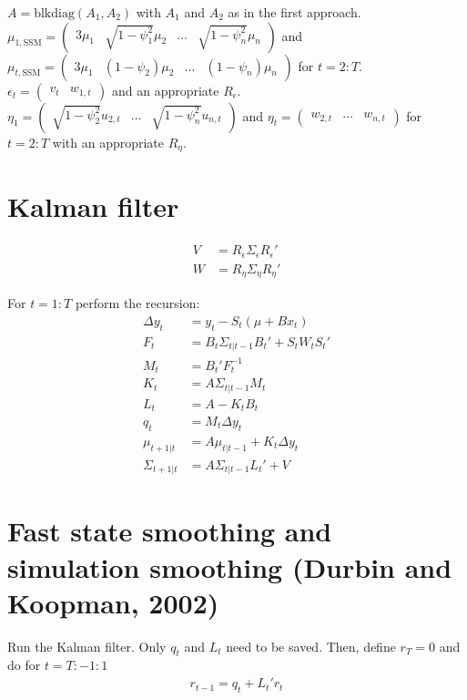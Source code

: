 $A = \mathrm{blkdiag}(A_1, A_2)$ with $A_1$ and $A_2$ as in the first approach. $\mu_{1,\mathrm{SSM}} = \begin{pmatrix} 3\mu_1& \sqrt{1-\psi_1^2}\mu_2 & \dots & \sqrt{1-\psi_n^2}\mu_n \end{pmatrix}$ and $\mu_{t,\mathrm{SSM}} = \begin{pmatrix} 3\mu_1& (1-\psi_2)\mu_2 & \dots & (1-\psi_n)\mu_n \end{pmatrix}$ for $t=2:T$. $\epsilon_t = \begin{pmatrix} v_t & w_{1,t} \end{pmatrix}$ and an appropriate $R_\epsilon$. $\eta_1 = \begin{pmatrix} \sqrt{1-\psi_2^2} u_{2,t} & \dots & \sqrt{1-\psi_n^2} u_{n,t} \end{pmatrix}$ and $\eta_t = \begin{pmatrix} w_{2,t} & \dots & w_{n,t} \end{pmatrix}$ for $t=2:T$ with an appropriate $R_\eta$.

\section{Kalman filter}

\begin{align}
V &= R_\epsilon \Sigma_\epsilon R_\epsilon' \\
W &= R_\eta \Sigma_\eta R_\eta'
\end{align}

For $t=1:T$ perform the recursion:
\begin{align}
\Delta y_t &= y_t - S_t(\mu + B x_t) \\
F_t &= B_t \Sigma_{t|t-1} B_t' + S_t W_t S_t' \\
M_t &= B_t' F_t^{-1} \\
K_t &= A \Sigma_{t|t-1} M_t \\
L_t &= A - K_t B_t \\
q_t &= M_t \Delta y_t \\
\mu_{t+1|t} &= A \mu_{t|t-1} + K_t \Delta y_t \\
\Sigma_{t+1|t} &= A \Sigma_{t|t-1} L_t' + V 
\end{align}

\section{Fast state smoothing and simulation smoothing (Durbin and Koopman, 2002)}

Run the Kalman filter. Only $q_t$ and $L_t$ need to be saved. Then, define $r_T=0$ and do for $t=T:-1:1$
\begin{align*}
r_{t-1} = q_t + L_t' r_t
\end{align*}

